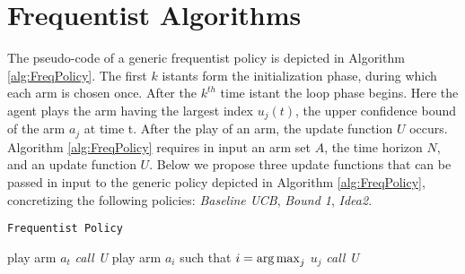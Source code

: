 %	
%	
%	


\section{Frequentist Algorithms}
The pseudo-code of a generic frequentist policy is depicted in Algorithm \ref{alg:FreqPolicy}.  The first $k$ istants form the initialization phase, during which  each arm is chosen once. After the $k^{th}$ time istant the loop phase begins. Here the agent plays the arm having the largest index $u_j(t)$, the upper confidence bound of the arm $a_j$ at time t. After the play of an arm, the update function $U$ occurs.
Algorithm \ref{alg:FreqPolicy} requires in input an arm set $A$, the time horizon $N$, and an update function $U$. Below we propose three update functions that can be passed in input to the generic policy depicted in Algorithm \ref{alg:FreqPolicy}, concretizing the following policies: \emph{Baseline UCB}, \emph{Bound 1}, \emph{Idea2}.

\begin{algorithm}[H]
	\caption{\texttt{Frequentist Policy}}
	\begin{scriptsize}
		\begin{algorithmic}[1]						
			 
			\State play arm $a_t$\;
			\State \emph{call U}\;
			\EndFor
			 
			\State play arm $a_i$ such that  $i = \operatorname*{arg\,max}_j$ $u_j $\;
			\State \emph{call U}\;
			\EndFor
			\EndFunction			
		\end{algorithmic}
	\end{scriptsize}
	\label{alg:FreqPolicy}
\end{algorithm}




